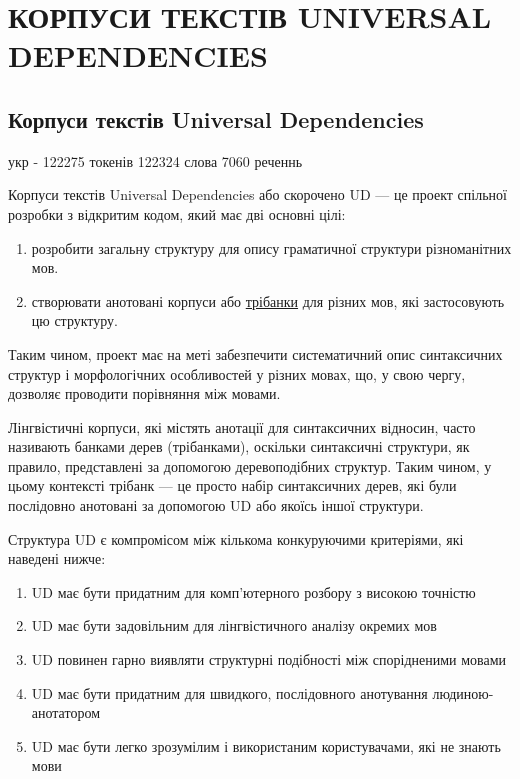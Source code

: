 \section{КОРПУСИ ТЕКСТІВ UNIVERSAL DEPENDENCIES}



\subsection{Корпуси текстів Universal Dependencies}
укр - 122275 токенів 122324 слова 7060 реченнь

Корпуси текстів Universal Dependencies або скорочено UD — це проект спільної розробки
з відкритим кодом, який має дві основні цілі:

\begin{enumerate}
    \item розробити загальну структуру для опису граматичної структури різноманітних мов.
    \cite{bib1}
    \item створювати анотовані корпуси або \hyperlink{term0}{трібанки} для різних мов,
    які застосовують цю структуру. \cite{bib2}
\end{enumerate}

Таким чином, проект має на меті забезпечити систематичний опис синтаксичних структур і
морфологічних особливостей у різних мовах, що, у свою чергу, дозволяє проводити порівняння
між мовами.

Лінгвістичні корпуси, які містять анотації для синтаксичних відносин,
часто називають банками дерев (трібанками), оскільки синтаксичні структури, як правило,
представлені за допомогою деревоподібних структур. Таким чином, у цьому контексті трібанк —
це просто набір синтаксичних дерев, які були послідовно анотовані за допомогою UD
або якоїсь іншої структури.

Структура UD є компромісом між кількома конкуруючими критеріями, які наведені нижче:

\begin{enumerate}
    \item UD має бути придатним для комп'ютерного розбору з високою точністю
    \item UD має бути задовільним для лінгвістичного аналізу окремих мов
    \item UD повинен гарно виявляти структурні подібності між спорідненими мовами
    \item UD має бути придатним для швидкого, послідовного анотування людиною-анотатором
    \item UD має бути легко зрозумілим і використаним користувачами, які не знають мови
\end{enumerate}


